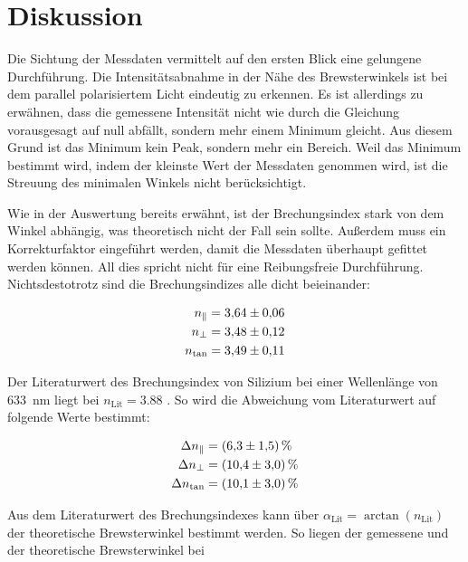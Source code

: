 


\section{Diskussion}
\label{sec:Diskussion}

Die Sichtung der Messdaten vermittelt auf den ersten Blick eine gelungene Durchführung. Die Intensitätsabnahme in der 
Nähe des Brewsterwinkels ist bei dem parallel polarisiertem Licht eindeutig zu erkennen. Es ist allerdings zu erwähnen, 
dass die gemessene Intensität nicht wie durch die Gleichung vorausgesagt auf null abfällt, sondern mehr einem Minimum 
gleicht. Aus diesem Grund ist das Minimum kein Peak, sondern mehr ein Bereich. Weil das Minimum bestimmt wird, indem 
der kleinste Wert der Messdaten genommen wird, ist die Streuung des minimalen Winkels nicht berücksichtigt.

\noindent Wie in der Auswertung bereits erwähnt, ist der Brechungsindex stark von dem Winkel abhängig, was theoretisch nicht der 
Fall sein sollte. Außerdem muss ein Korrekturfaktor eingeführt werden, damit die Messdaten überhaupt gefittet werden 
können. All dies spricht nicht für eine Reibungsfreie Durchführung. \\
\noindent Nichtsdestotrotz sind die Brechungsindizes alle dicht beieinander: 

\begin{align*}
    n_\parallel &= \num{3.64 \pm 0.06}\\
    n_\bot      &= \num{3.48 \pm 0.12}\\
    n_\text{tan} &=\num{3.49\pm0.11}
\end{align*}

\noindent Der Literaturwert des Brechungsindex von Silizium bei einer Wellenlänge von \qty{633}{\nano\meter} liegt bei 
$n_\text{Lit}=\num{3.88}$ \cite{Brechungsindex_SI}. So wird die Abweichung vom Literaturwert auf folgende Werte bestimmt:

\begin{align*}
    \Delta n_\parallel &= \qty{6.3  \pm 1.5}{\percent}\\
    \Delta n_\bot      &= \qty{10.4 \pm 3.0}{\percent}\\
    \Delta n_\text{tan} &=\qty{10.1 \pm 3.0}{\percent}
\end{align*}

\noindent Aus dem Literaturwert des Brechungsindexes kann über $\alpha_\text{Lit}=\arctan{(n_\text{Lit})}$ der theoretische 
Brewsterwinkel bestimmt werden. So liegen der gemessene und der theoretische Brewsterwinkel bei

